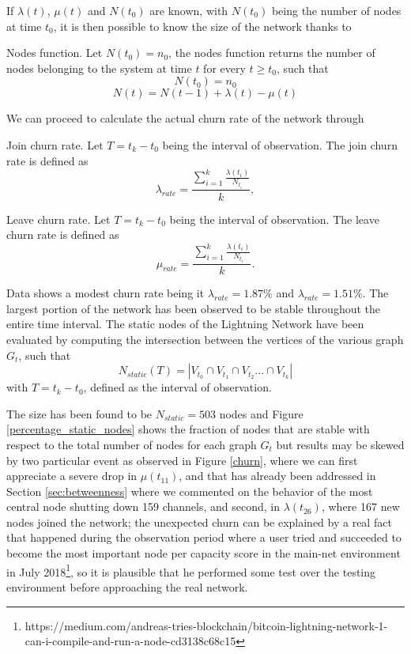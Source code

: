 	If $\lambda(t)$, $\mu(t)$ and $N(t_0)$ are known, with $N(t_0)$ being the number of nodes at time $t_0$, it is then possible to know the size of the network thanks to
	\begin{definition}
		Nodes function. Let $N(t_0) = n_0$, the nodes function returns the number of nodes belonging to the system at time $t$ for every $t \geq t_0$, such that 
		$$N(t_0) = n_0$$
		$$N(t) = N(t-1) + \lambda(t) - \mu(t)$$
	\end{definition}
	We can proceed to calculate the actual churn rate of the network through
	\begin{definition}
		Join churn rate. Let $T = t_k - t_0$ being the interval of observation. The join churn rate is defined as
		$$\lambda_{rate} = \frac{\sum_{i = 1}^{k}\frac{\lambda(t_i)}{N_{t_i}}}{k},$$
	\end{definition} 
	\begin{definition}
		Leave churn rate. Let $T = t_k - t_0$ being the interval of observation. The leave churn rate is defined as
		$$\mu_{rate} = \frac{\sum_{i = 1}^{k}\frac{\lambda(t_i)}{N_{t_{i}}}}{k}.$$
	\end{definition}

	Data shows a modest churn rate being it $\lambda_{rate}=1.87\%$ and
	$\lambda_{rate}=1.51\%$. The largest portion of the network has been observed to be stable throughout the entire time interval. The static nodes of the Lightning Network have been evaluated by computing the intersection between the vertices of the various graph $G_t$, such that
	$$N_{static}(T) = |V_{t_0} \cap V_{t_1} \cap V_{t_2} ... \cap V_{t_k}|$$
	with $T = t_k - t_0$, defined as the interval of observation.
	
	The size has been found to be $N_{static} = 503$ nodes and Figure \ref{percentage_static_nodes} shows the fraction of nodes that are stable with respect to the total number of nodes for each graph $G_t$ but results may be skewed by two particular event as observed in Figure \ref{churn}, where we can first appreciate a severe drop in $\mu(t_{11})$, and that has already been addressed in Section \ref{sec:betweenness} where we commented on the behavior of the most central node shutting down 159 channels, and second, in $\lambda(t_{26})$, where 167 new nodes joined the network; the unexpected churn can be explained by a real fact that happened during the observation period where a user tried and succeeded to become the most important node per capacity score in the main-net environment in July 2018\footnote{https://medium.com/andreas-tries-blockchain/bitcoin-lightning-network-1-can-i-compile-and-run-a-node-cd3138c68c15}, so it is plausible that he performed some test over the testing environment before approaching the real network.
	
